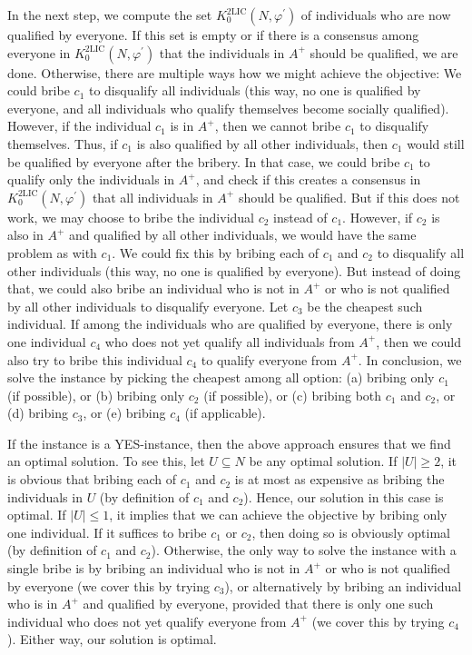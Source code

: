 \documentclass[
    12pt,               %
    a4paper,            %
    bibtotoc,           %
    pointlessnumbers,   %
    ngerman,            %
    titlepage,          %
    leqno,              %
    ]{scrarticle}       %
\begin{document}
\begin{Proof}
\begin{enumerate}[
    leftmargin=*,
    label={\textit{Case \ref*{thm:2lic_cgb_p}.\arabic*}:}
]
In the next step, we compute the set $K^{\text{2LIC}}_0(N, \varphi^\prime)$ of individuals who are now qualified by everyone. If this set is empty or if there is a consensus among everyone in $K^{\text{2LIC}}_0(N, \varphi^\prime)$ that the individuals in $A^+$ should be qualified, we are done. Otherwise, there are multiple ways how we might achieve the objective: We could bribe $c_1$ to disqualify all individuals (this way, no one is qualified by everyone, and all individuals who qualify themselves become socially qualified). However, if the individual $c_1$ is in $A^+$, then we cannot bribe $c_1$ to disqualify themselves. Thus, if $c_1$ is also qualified by all other individuals, then $c_1$ would still be qualified by everyone after the bribery. In that case, we could bribe $c_1$ to qualify only the individuals in $A^+$, and check if this creates a consensus in $K^{\text{2LIC}}_0(N, \varphi^\prime)$ that all individuals in $A^+$ should be qualified. But if this does not work, we may choose to bribe the individual $c_2$ instead of $c_1$. However, if $c_2$ is also in $A^+$ and qualified by all other individuals, we would have the same problem as with $c_1$. We could fix this by bribing each of $c_1$ and $c_2$ to disqualify all other individuals (this way, no one is qualified by everyone). But instead of doing that, we could also bribe an individual who is not in $A^+$ or who is not qualified by all other individuals to disqualify everyone. Let $c_3$ be the cheapest such individual. If among the individuals who are qualified by everyone, there is only one individual $c_4$ who does not yet qualify all individuals from $A^+$, then we could also try to bribe this individual $c_4$ to qualify everyone from $A^+$. In conclusion, we solve the instance by picking the cheapest among all option: (a) bribing only $c_1$ (if possible), or (b) bribing only $c_2$ (if possible), or (c) bribing both $c_1$ and $c_2$, or (d) bribing $c_3$, or (e) bribing $c_4$ (if applicable).

If the instance is a YES-instance, then the above approach ensures that we find an optimal solution. To see this, let $U \subseteq N$ be any optimal solution. If $|U| \geq 2$, it is obvious that bribing each of $c_1$ and $c_2$ is at most as expensive as bribing the individuals in $U$ (by definition of $c_1$ and $c_2$). Hence, our solution in this case is optimal. If $|U| \leq 1$, it implies that we can achieve the objective by bribing only one individual. If it suffices to bribe $c_1$ or $c_2$, then doing so is obviously optimal (by definition of $c_1$ and $c_2$). Otherwise, the only way to solve the instance with a single bribe is by bribing an individual who is not in $A^+$ or who is not qualified by everyone (we cover this by trying $c_3$), or alternatively by bribing an individual who is in $A^+$ and qualified by everyone, provided that there is only one such individual who does not yet qualify everyone from $A^+$ (we cover this by trying $c_4$). Either way, our solution is optimal.
\end{enumerate}


\end{Proof}
\end{document}
